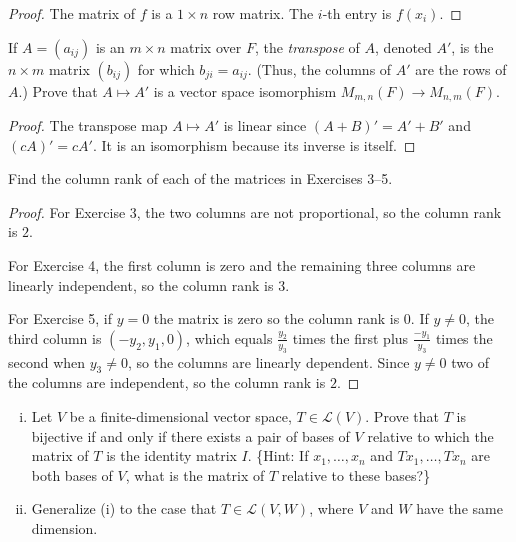 \begin{proof}
    The matrix of $f$ is a $1 \times n$ row matrix.
    The $i$-th entry is $f(x_i)$.
\end{proof}

\begin{tcolorbox}[title=Exercise 9, breakable]
    If $A = (a_{ij})$ is an $m \times n$ matrix over $F$, the
    \emph{transpose} of $A$, denoted $A'$, is the $n \times m$
    matrix $(b_{ij})$ for which $b_{ji} = a_{ij}$. (Thus, the
    columns of $A'$ are the rows of $A$.) Prove that $A \mapsto A'$
    is a vector space isomorphism $M_{m,n}(F) \to M_{n,m}(F)$.
\end{tcolorbox}

\begin{proof}
    The transpose map $A \mapsto A'$ is linear since
    $(A + B)' = A' + B'$ and $(cA)' = cA'$.
    It is an isomorphism because its inverse is itself.
\end{proof}

\begin{tcolorbox}[title=Exercise 11, breakable]
    Find the column rank of each of the matrices in Exercises 3--5.
\end{tcolorbox}

\begin{proof}
    For Exercise 3, the two columns are not proportional, so the column rank is $2$.

    For Exercise 4, the first column is zero and the remaining three columns
    are linearly independent, so the column rank is $3$.

    For Exercise 5, if $y = 0$ the matrix is zero so the column rank is $0$.
    If $y \ne 0$, the third column is $(-y_2, y_1, 0)$, which equals
    $\frac{y_2}{y_3}$ times the first plus $\frac{-y_1}{y_3}$ times the second
    when $y_3 \ne 0$, so the columns are linearly dependent. Since $y \ne 0$
    two of the columns are independent, so the column rank is $2$.
\end{proof}

\begin{tcolorbox}[title=Exercise 12, breakable]
    \begin{enumerate}[(i)]
        \item Let $V$ be a finite-dimensional vector space,
        $T \in \mathcal{L}(V)$. Prove that $T$ is bijective if
        and only if there exists a pair of bases of $V$ relative
        to which the matrix of $T$ is the identity matrix $I$.
        \{Hint: If $x_1, \ldots, x_n$ and $Tx_1, \ldots, Tx_n$
        are both bases of $V$, what is the matrix of $T$ relative
        to these bases?\}

        \item Generalize (i) to the case that $T \in \mathcal{L}(V, W)$,
        where $V$ and $W$ have the same dimension.
    \end{enumerate}
\end{tcolorbox}

